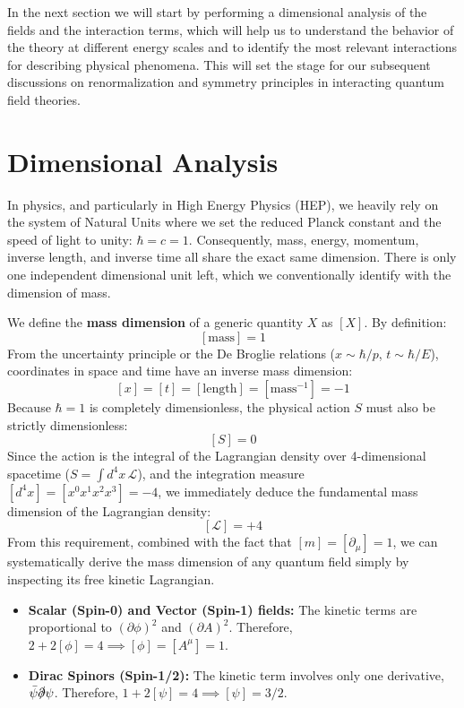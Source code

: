 In the next section we will start by performing a dimensional analysis of the fields and the interaction terms, which will help us to understand the behavior of the theory at different energy scales and to identify the most relevant interactions for describing physical phenomena. This will set the stage for our subsequent discussions on renormalization and symmetry principles in interacting quantum field theories.

\section{Dimensional Analysis}

In physics, and particularly in High Energy Physics (HEP), we heavily rely on the system of Natural Units where we set the reduced Planck constant and the speed of light to unity: \(\hbar = c = 1\). Consequently, mass, energy, momentum, inverse length, and inverse time all share the exact same dimension. There is only one independent dimensional unit left, which we conventionally identify with the dimension of mass.

We define the \textbf{mass dimension} of a generic quantity \(X\) as \([X]\). By definition:
\[
    [\text{mass}] = 1
\]
From the uncertainty principle or the De Broglie relations (\(x \sim \hbar/p\), \(t \sim \hbar/E\)), coordinates in space and time have an inverse mass dimension:
\[
    [x] = [t] = [\text{length}] = [\text{mass}^{-1}] = -1
\]
Because \(\hbar = 1\) is completely dimensionless, the physical action \(S\) must also be strictly dimensionless:
\[
    [S] = 0
\]
Since the action is the integral of the Lagrangian density over 4-dimensional spacetime (\(S = \int d^4x \, \mathcal{L}\)), and the integration measure \([d^4x] = [x^0 x^1 x^2 x^3] = -4\), we immediately deduce the fundamental mass dimension of the Lagrangian density:
\[
    [\mathcal{L}] = +4
\]
From this requirement, combined with the fact that \([m] = [\partial_\mu] = 1\), we can systematically derive the mass dimension of any quantum field simply by inspecting its free kinetic Lagrangian.
\begin{itemize}
    \item \textbf{Scalar (Spin-0) and Vector (Spin-1) fields:}
          The kinetic terms are proportional to \((\partial \phi)^2\) and \((\partial A)^2\). Therefore, \(2 + 2[\phi] = 4 \implies [\phi] = [A^\mu] = 1\).
    \item \textbf{Dirac Spinors (Spin-1/2):}
          The kinetic term involves only one derivative, \(\bar{\psi}\slashed{\partial}\psi\). Therefore, \(1 + 2[\psi] = 4 \implies [\psi] = 3/2\).
\end{itemize}

